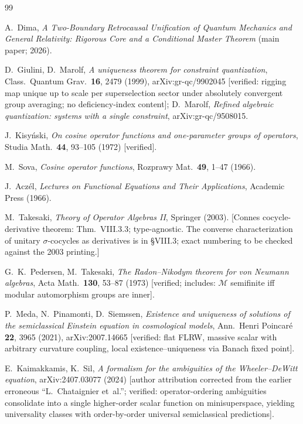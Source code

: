 \documentclass[11pt,a4paper]{article}
\theoremstyle{definition}
\theoremstyle{remark}
\newcommand{\MM}{\mathcal{M}}
\begin{document}
\begin{thebibliography}{99}

A.~Dima, \emph{A Two-Boundary Retrocausal Unification of
Quantum Mechanics and General Relativity: Rigorous Core and
a Conditional Master Theorem} (main paper; 2026).

D.~Giulini, D.~Marolf, \emph{A uniqueness theorem for
constraint quantization}, Class.~Quantum Grav.~\textbf{16},
2479 (1999), arXiv:gr-qc/9902045 [verified: rigging map unique
up to scale per superselection sector under absolutely
convergent group averaging; no deficiency-index content];
D.~Marolf, \emph{Refined algebraic quantization: systems with
a single constraint}, arXiv:gr-qc/9508015.

J.~Kisy\'nski, \emph{On cosine operator functions and
one-parameter groups of operators}, Studia Math.~\textbf{44},
93--105 (1972) [verified].

M.~Sova, \emph{Cosine operator functions}, Rozprawy
Mat.~\textbf{49}, 1--47 (1966).

J.~Acz\'el, \emph{Lectures on Functional Equations and Their
Applications}, Academic Press (1966).

M.~Takesaki, \emph{Theory of Operator Algebras II}, Springer
(2003). [Connes cocycle-derivative theorem: Thm.~VIII.3.3;
type-agnostic. The converse characterization of unitary
$\sigma$-cocycles as derivatives is in \S VIII.3; exact
numbering to be checked against the 2003 printing.]

G.~K.~Pedersen, M.~Takesaki, \emph{The Radon--Nikodym theorem
for von Neumann algebras}, Acta Math.~\textbf{130}, 53--87
(1973) [verified; includes: $\MM$ semifinite iff modular
automorphism groups are inner].

P.~Meda, N.~Pinamonti, D.~Siemssen, \emph{Existence and
uniqueness of solutions of the semiclassical Einstein
equation in cosmological models}, Ann.~Henri Poincar\'e~
\textbf{22}, 3965 (2021), arXiv:2007.14665 [verified: flat
FLRW, massive scalar with arbitrary curvature coupling, local
existence--uniqueness via Banach fixed point].

E.~Kaimakkamis, K.~Sil, \emph{A formalism for the ambiguities
of the Wheeler--DeWitt equation}, arXiv:2407.03077 (2024)
[author attribution corrected from the earlier erroneous
``L.~Chataignier et~al.''; verified: operator-ordering
ambiguities consolidate into a single higher-order scalar
function on minisuperspace, yielding universality classes with
order-by-order universal semiclassical predictions].


\end{thebibliography}
\end{document}
